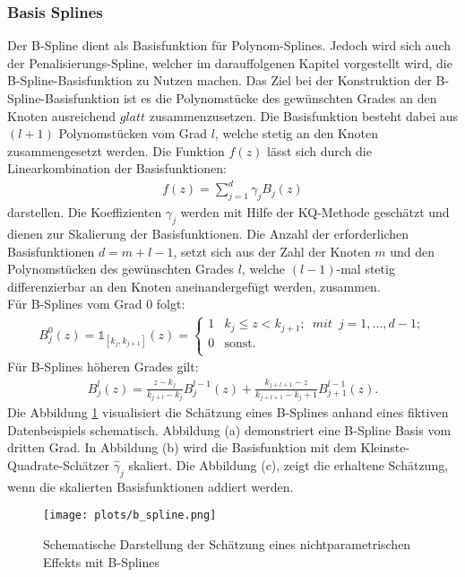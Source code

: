 \documentclass[12pt]{scrreprt}
\begin{document}
\subsubsection{Basis Splines}
Der B-Spline dient als Basisfunktion für Polynom-Splines. Jedoch wird sich auch der Penalisierungs-Spline, welcher im darauffolgenen Kapitel vorgestellt wird, die B-Spline-Basisfunktion zu Nutzen machen. Das Ziel bei der Konstruktion der B-Spline-Basisfunktion ist es die Polynomstücke des gewünschten Grades an den Knoten ausreichend $glatt$ zusammenzusetzen. Die Basisfunktion besteht dabei aus $(l+1)$ Polynomstücken vom Grad $l$, welche stetig an den Knoten zusammengesetzt werden. Die Funktion $f(z)$ lässt sich durch die Linearkombination der Basisfunktionen:
\begin{align}
f(z)=\sum_{j=1}^d\gamma_{j}B_{j}(z)
\end{align}
darstellen. Die Koeffizienten  $\gamma_{j}$ werden mit Hilfe der KQ-Methode geschätzt und dienen zur Skalierung der Basisfunktionen. Die Anzahl der erforderlichen Basisfunktionen $d = m+l-1$, setzt sich aus der Zahl der Knoten $m$ und den Polynomstücken des gewünschten Grades $l$, welche $(l-1)$-mal stetig differenzierbar an den Knoten aneinandergefügt werden, zusammen.  \\
Für B-Splines vom Grad 0 folgt:
\begin{align}
B_{j}^0(z)= \mathbb{1}_{[k_{j},k_{j+1}]}(z)= 
\begin{cases}
1 & k_{j} \leq z<k_{j+1};\enspace mit\enspace j=1,...,d-1; \\
0 & \text{sonst.} \\
\end{cases}
\end{align}
Für B-Splines höheren Grades gilt:
\begin{align}
B_{j}^l(z)= \frac{z-k_{j}}{k_{j+l}-k_{j}}B_{j}^{l-1}(z)+
\frac{k_{j+l+1}-z}{k_{j+l+1}-k_j+1}B_{j+1}^{l-1}(z).
\end{align}
Die Abbildung \ref{pic:b_spline} visualisiert die Schätzung eines B-Splines anhand eines fiktiven Datenbeispiels schematisch. Abbildung (a) demonstriert eine B-Spline Basis vom dritten Grad. In Abbildung (b) wird die Basisfunktion mit dem Kleinste-Quadrate-Schätzer $\hat\gamma_{j}$ skaliert. Die Abbildung (c), zeigt die erhaltene Schätzung, wenn die skalierten Basisfunktionen addiert werden.
\begin{figure}[H]
	\centering
	\texttt{[image: plots/b\_spline.png]}
	\caption{Schematische Darstellung der Schätzung eines nichtparametrischen Effekts mit B-Splines}
	\label{pic:b_spline}
\end{figure}
\end{document}
